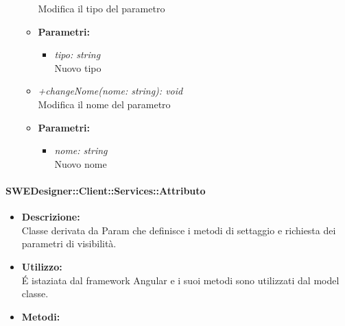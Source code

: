 \begin{itemize}
\begin{itemize}
            			Modifica il tipo del parametro
            			\item \textbf{Parametri:}\\
            				\begin{itemize}
            					\item \emph{tipo: string}\\
            					Nuovo tipo
            				\end{itemize}
            			\item \emph{+changeNome(nome: string): void}\\
            			Modifica il nome del parametro
            			\item \textbf{Parametri:}\\
            				\begin{itemize}
            					\item \emph{nome: string}\\
            					Nuovo nome
            				\end{itemize}            			
          			\end{itemize}
          		\end{itemize}
          	\paragraph{SWEDesigner::Client::Services::Attributo}
				\begin{itemize}
          			\item \textbf{Descrizione:}\\
          			Classe derivata da Param che definisce i metodi di settaggio e richiesta dei parametri di visibilità.
          			\item \textbf{Utilizzo:}\\
          			É istaziata dal framework Angular e i suoi metodi sono utilizzati dal model classe.
          			\item \textbf{Metodi:}\\
          		\end{itemize}
